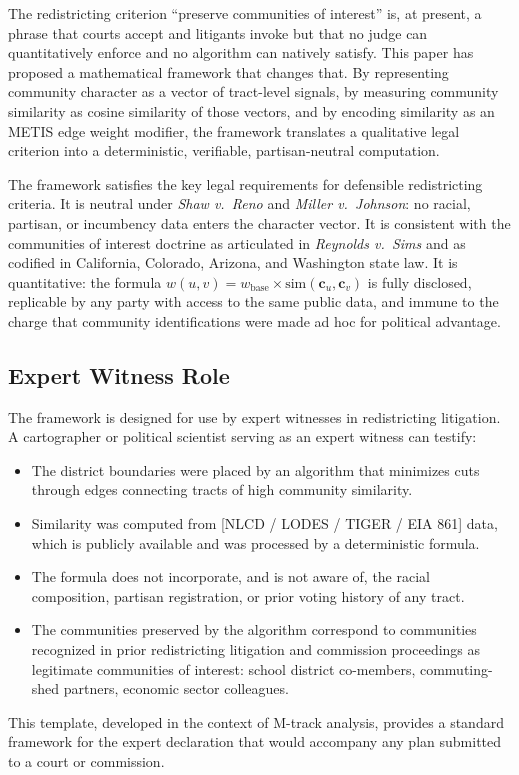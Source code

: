 \label{sec:conclusion}

The redistricting criterion ``preserve communities of interest'' is, at present,
a phrase that courts accept and litigants invoke but that no judge can quantitatively
enforce and no algorithm can natively satisfy.
This paper has proposed a mathematical framework that changes that.
By representing community character as a vector of tract-level signals, by measuring
community similarity as cosine similarity of those vectors, and by encoding similarity
as an METIS edge weight modifier, the framework translates a qualitative legal
criterion into a deterministic, verifiable, partisan-neutral computation.

The framework satisfies the key legal requirements for defensible redistricting criteria.
It is neutral under \textit{Shaw v.\ Reno} and \textit{Miller v.\ Johnson}: no
racial, partisan, or incumbency data enters the character vector.
It is consistent with the communities of interest doctrine as articulated in
\textit{Reynolds v.\ Sims} and as codified in California, Colorado, Arizona, and
Washington state law.
It is quantitative: the formula $w(u,v) = w_{\mathrm{base}} \times \mathrm{sim}(\mathbf{c}_u, \mathbf{c}_v)$
is fully disclosed, replicable by any party with access to the same public data, and
immune to the charge that community identifications were made ad hoc for political advantage.

\subsection{Expert Witness Role}

The framework is designed for use by expert witnesses in redistricting litigation.
A cartographer or political scientist serving as an expert witness can testify:
\begin{itemize}
  \item The district boundaries were placed by an algorithm that minimizes cuts
    through edges connecting tracts of high community similarity.
  \item Similarity was computed from [NLCD / LODES / TIGER / EIA 861] data, which is
    publicly available and was processed by a deterministic formula.
  \item The formula does not incorporate, and is not aware of, the racial composition,
    partisan registration, or prior voting history of any tract.
  \item The communities preserved by the algorithm correspond to communities
    recognized in prior redistricting litigation and commission proceedings as
    legitimate communities of interest: school district co-members, commuting-shed
    partners, economic sector colleagues.
\end{itemize}
This template, developed in the context of M-track analysis, provides a standard
framework for the expert declaration that would accompany any plan submitted
to a court or commission.


